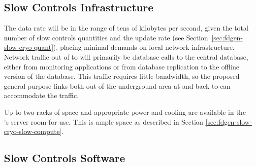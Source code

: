 


\subsection{Slow Controls Infrastructure}
\label{sec:fdgen-slow-cryo-slow-infra}

The data rate will be in the range of tens of kilobytes per second, given the total number of slow controls quantities and the update rate  
(see Section~\ref{sec:fdgen-slow-cryo-quant}), placing minimal demands
on local network infrastructure.
Network traffic out of \surf to \fnal will primarily be database calls
to the central  database, either from monitoring applications or from
database replication to the offline version of the  database.  This
traffic requires little bandwidth, so the proposed general purpose
links both out of the %
underground area at \surf and back to \fnal can accommodate the traffic.

Up to two racks of space and appropriate power and cooling are
available in the 's  server room for  use. This is ample space as described in Section
\ref{sec:fdgen-slow-cryo-slow-compute}.


\subsection{Slow Controls Software}
\label{sec:fdgen-slow-cryo-sw}


